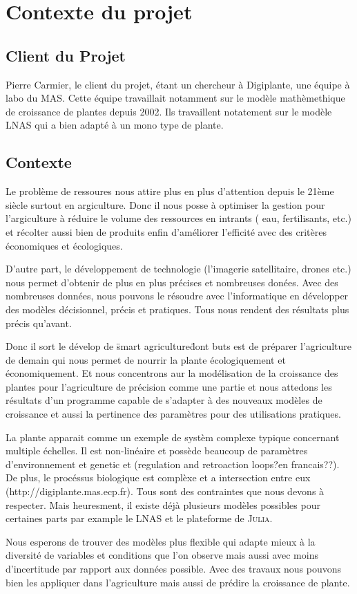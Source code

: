 \section{Contexte du projet}

\subsection{Client du Projet}
Pierre Carmier, le client du projet, étant un chercheur à Digiplante,
une équipe à labo du MAS. Cette équipe travaillait notamment sur le modèle
mathèmethique de croissance de plantes depuis 2002. 
Ils travaillent notatement sur le modèle LNAS qui a bien adapté
à un mono type de plante.

\subsection{Contexte}
Le problème de ressoures nous attire plus en plus d'attention depuis le 21ème siècle
surtout en argiculture. Donc il nous posse à optimiser la gestion pour l'argiculture
à réduire le volume des ressources en intrants ( eau, fertilisants, etc.)
et récolter aussi bien de produits enfin d'améliorer l'efficité
avec des critères économiques et écologiques.

D'autre part, le développement de technologie (l'imagerie satellitaire, drones etc.)
nous permet d'obtenir de plus en plus précises et nombreuses donées. 
Avec des nombreuses données, nous pouvons le résoudre avec l'informatique en
développer des modèles décisionnel, précis et pratiques. 
Tous nous rendent des résultats plus précis qu'avant.

Donc il sort le dévelop de \"smart agriculture\" dont buts est de préparer
l'agriculture de demain qui nous permet de nourrir la plante écologiquement et
économiquement. Et nous concentrons aur la modélisation de la croissance des plantes
pour l'agriculture de précision comme une partie et nous attedons les résultats 
d'un programme capable de s'adapter à des nouveaux modèles de croissance et 
aussi la pertinence des paramètres pour des utilisations pratiques. 

La plante apparait comme un exemple de systèm complexe typique concernant 
multiple échelles. Il est non-linéaire et possède beaucoup de paramètres
d'environnement et genetic et (regulation and retroaction loops?en francais??).
De plus,  le procéssus biologique est complèxe et a intersection entre eux
(http://digiplante.mas.ecp.fr). Tous sont des contraintes que 
nous devons à respecter. Mais heuresment, 
il existe déjà plusieurs modèles possibles pour certaines parts 
par example le LNAS et le plateforme de \textsc{Julia}.

Nous esperons de trouver des modèles plus flexible qui adapte mieux à la diversité
de variables et conditions que l'on observe mais aussi avec moins d'incertitude 
par rapport aux données possible. Avec des travaux 
nous pouvons bien les appliquer dans l'agriculture 
mais aussi de prédire la croissance de plante.
